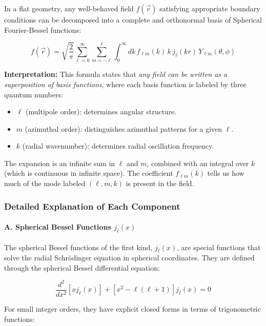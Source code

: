 In a flat geometry, any well-behaved field $f(\vec{r})$ satisfying appropriate boundary conditions can be decomposed into a complete and orthonormal basis of Spherical Fourier-Bessel functions:

\begin{equation}
f(\vec{r}) = \sqrt{\frac{2}{\pi}} \sum_{\ell=0}^{\infty} \sum_{m=-\ell}^{\ell} \int_0^{\infty} dk \, f_{\ell m}(k) \, k \, j_\ell(kr) \, Y_{\ell m}(\theta, \phi)
\label{eq:sfb_forward}
\end{equation}

\textbf{Interpretation:} This formula states that \emph{any field can be written as a superposition of basis functions}, where each basis function is labeled by three quantum numbers:
\begin{itemize}
    \item $\ell$ (multipole order): determines angular structure.
    \item $m$ (azimuthal order): distinguishes azimuthal patterns for a given $\ell$.
    \item $k$ (radial wavenumber): determines radial oscillation frequency.
\end{itemize}

The expansion is an infinite sum in $\ell$ and $m$, combined with an integral over $k$ (which is continuous in infinite space). The coefficient $f_{\ell m}(k)$ tells us how much of the mode labeled $(\ell, m, k)$ is present in the field.

\subsubsection{Detailed Explanation of Each Component}

\paragraph{A. Spherical Bessel Functions $j_\ell(x)$}

The spherical Bessel functions of the first kind, $j_\ell(x)$, are special functions that solve the radial Schrödinger equation in spherical coordinates. They are defined through the spherical Bessel differential equation:

\begin{equation}
\frac{d^2}{dx^2}[x j_\ell(x)] + \left[x^2 - \ell(\ell+1)\right] j_\ell(x) = 0
\end{equation}

For small integer orders, they have explicit closed forms in terms of trigonometric functions:


